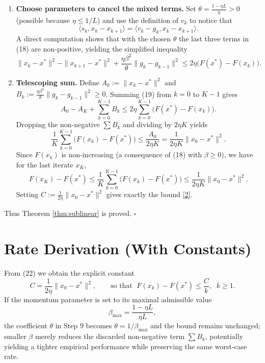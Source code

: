 \documentclass{article}
\begin{document}
\begin{enumerate}
\[\begin{aligned}
&\qquad+2\eta\langle s_{k},x_{k}-x^{*}\rangle
   -2\eta\langle s_{k},x_{k}-x_{k+1}\rangle
   +\frac{\eta\beta^{2}}{\theta}\|g_{k}-g_{k-1}\|^{2}
   +\eta\theta\|x^{*}-x_{k+1}\|^{2}\le0 .
\end{aligned}
\tag{18}
\]
\item[Step 9.] \textbf{Choose parameters to cancel the mixed terms.}  
Set $\theta=\frac{1-\eta L}{\eta}>0$ (possible because $\eta\le1/L$) and use the definition of $v_{k}$ to notice that
\[
\langle s_{k},x_{k}-x_{k+1}\rangle = \langle v_{k}-g_{k},x_{k}-x_{k+1}\rangle .
\]
A direct computation shows that with the chosen $\theta$ the last three terms in (18) are non‑positive, yielding the simplified inequality
\[
\|x_{k}-x^{*}\|^{2}-\|x_{k+1}-x^{*}\|^{2}
   +\frac{\eta\beta^{2}}{\theta}\|g_{k}-g_{k-1}\|^{2}
   \le 2\eta\bigl(F(x^{*})-F(x_{k})\bigr).
\tag{19}
\]
\item[Step 10.] \textbf{Telescoping sum.}  
Define $A_{k}:=\|x_{k}-x^{*}\|^{2}$ and $B_{k}:=\frac{\eta\beta^{2}}{\theta}\|g_{k}-g_{k-1}\|^{2}\ge0$.  
Summing (19) from $k=0$ to $K-1$ gives
\[
A_{0}-A_{K}+\sum_{k=0}^{K-1}B_{k}
   \le 2\eta\sum_{k=0}^{K-1}\bigl(F(x^{*})-F(x_{k})\bigr).
\tag{20}
\]
Dropping the non‑negative $\sum B_{k}$ and dividing by $2\eta K$ yields
\[
\frac{1}{K}\sum_{k=0}^{K-1}\bigl(F(x_{k})-F(x^{*})\bigr)
   \le \frac{A_{0}}{2\eta K}
   =\frac{1}{2\eta K}\|x_{0}-x^{*}\|^{2}.
\tag{21}
\]
Since $F(x_{k})$ is non‑increasing (a consequence of (18) with $\beta\ge0$), we have for the last iterate $x_{K}$,
\[
F(x_{K})-F(x^{*})\le\frac{1}{K}\sum_{k=0}^{K-1}\bigl(F(x_{k})-F(x^{*})\bigr)
   \le\frac{1}{2\eta K}\|x_{0}-x^{*}\|^{2}.
\tag{22}
\]
Setting $C:=\frac{1}{2\eta}\|x_{0}-x^{*}\|^{2}$ gives exactly the bound \eqref{2}.
\end{enumerate}
Thus Theorem \ref{thm:sublinear} is proved. $\square$

\section*{Rate Derivation (With Constants)}
From (22) we obtain the explicit constant
\[
C=\frac{1}{2\eta}\|x_{0}-x^{*}\|^{2},
\qquad
\text{so that }\;
F(x_{k})-F(x^{*})\le\frac{C}{k},\;\;k\ge1.
\]
If the momentum parameter is set to its maximal admissible value 
\[
\beta_{\max}= \frac{1-\eta L}{\eta L},
\]
the coefficient $\theta$ in Step 9 becomes $\theta=1/\beta_{\max}$ and the bound remains unchanged; smaller $\beta$ merely reduces the discarded non‑negative term $\sum B_{k}$, potentially yielding a tighter empirical performance while preserving the same worst‑case rate.
\end{document}
